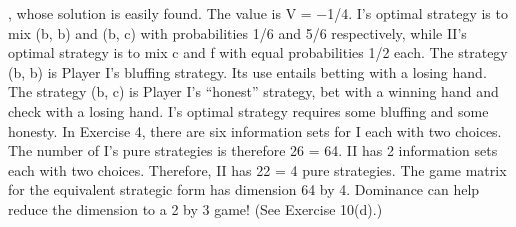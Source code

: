\documentclass[]{report}
\begin{document}
, whose solution is
easily found. The value is V = −1/4. I’s optimal strategy is to mix (b, b) and (b, c) with
probabilities 1/6 and 5/6 respectively, while II’s optimal strategy is to mix c and f with
equal probabilities 1/2 each. The strategy (b, b) is Player I’s bluffing strategy. Its use
entails betting with a losing hand. The strategy (b, c) is Player I’s “honest” strategy, bet
with a winning hand and check with a losing hand. I’s optimal strategy requires some
bluffing and some honesty.
In Exercise 4, there are six information sets for I each with two choices. The number
of I’s pure strategies is therefore 26 = 64. II has 2 information sets each with two choices.
Therefore, II has 22 = 4 pure strategies. The game matrix for the equivalent strategic
form has dimension 64 by 4. Dominance can help reduce the dimension to a 2 by 3 game!
(See Exercise 10(d).)
\end{document}
